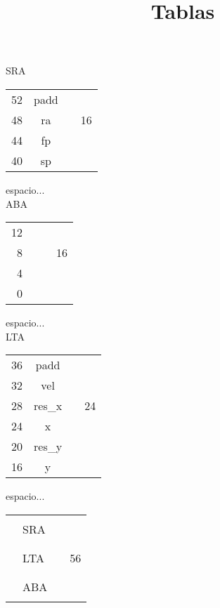 \documentclass[a4paper,11pt]{article}
\title{Tablas}
\author{}
\begin{document}
SRA
\begin{tabular}{ r | c | c | l }
  \cline{2-2}                       
  52 & padd& & \\ \cline{2-2}
  48 & ra & &  16 \\ \cline{2-2}
  44 & fp& & \\ \cline{2-2}
  40 & sp & &\\
  \cline{2-2}
\end{tabular}

espacio... \\


ABA
\begin{tabular}{ r | p{1cm} | c | l }
  \cline{2-2}                       
  12 &  & & \\ \cline{2-2}
  8 &   & &  16 \\ \cline{2-2}
  4 &  & & \\ \cline{2-2}
  0 &   & &\\
  \cline{2-2}
\end{tabular}


espacio... \\


LTA
\begin{tabular}{ r | c | c | l }
  \cline{2-2}                       
  36 & padd& & \\ \cline{2-2}
  32 & vel & &   \\ \cline{2-2}
  28 & res\_x & & 24 \\ \cline{2-2}
  24 & x & &\\ \cline{2-2}
  20 & res\_y & & \\ \cline{2-2}
  16 & y & &\\
  \cline{2-2}
\end{tabular}



espacio... \\


\begin{tabular}{ r | p{1cm} | c | l }
  \cline{2-2}              
   & & & \\        
   & SRA & & \\ 
   & & & \\ \cline{2-2}
   & & & \\ 
   & LTA & &  56 \\ 
   & & & \\ \cline{2-2}
   & & & \\ 
   & ABA & &\\
   & & & \\ 
  \cline{2-2}
\end{tabular}
\end{document}
